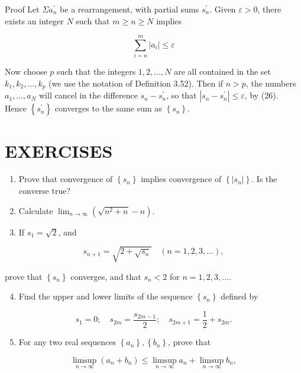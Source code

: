\documentclass[10pt]{article}
\begin{document}
Proof Let $\Sigma a_{n}^{\prime}$ be a rearrangement, with partial sums $s_{n}^{\prime}$. Given $\varepsilon>0$, there exists an integer $N$ such that $m \geq n \geq N$ implies

$$
\sum_{i=n}^{m}\left|a_{i}\right| \leq \varepsilon
$$

Now choose $p$ such that the integers $1,2, \ldots, N$ are all contained in the set $k_{1}, k_{2}, \ldots, k_{p}$ (we use the notation of Definition 3.52). Then if $n>p$, the numbers $a_{1}, \ldots, a_{N}$ will cancel in the difference $s_{n}-s_{n}^{\prime}$, so that $\left|s_{n}-s_{n}^{\prime}\right| \leq \varepsilon$, by (26). Hence $\left\{s_{n}^{\prime}\right\}$ converges to the same sum as $\left\{s_{n}\right\}$.

\section{EXERCISES}
\begin{enumerate}
  \item Prove that convergence of $\left\{s_{n}\right\}$ implies convergence of $\left\{\left|s_{n}\right|\right\}$. Is the converse true?

  \item Calculate $\lim _{n \rightarrow \infty}\left(\sqrt{n^{2}+n}-n\right)$.

  \item If $s_{1}=\sqrt{2}$, and

\end{enumerate}

$$
s_{n+1}=\sqrt{2+\sqrt{s_{n}}} \quad(n=1,2,3, \ldots),
$$

prove that $\left\{s_{n}\right\}$ converges, and that $s_{n}<2$ for $n=1,2,3, \ldots$.

\begin{enumerate}
  \setcounter{enumi}{3}
  \item Find the upper and lower limits of the sequence $\left\{s_{n}\right\}$ defined by
\end{enumerate}

$$
s_{1}=0 ; \quad s_{2 m}=\frac{s_{2 m-1}}{2} ; \quad s_{2 m+1}=\frac{1}{2}+s_{2 m} .
$$

\begin{enumerate}
  \setcounter{enumi}{4}
  \item For any two real sequences $\left\{a_{n}\right\},\left\{b_{n}\right\}$, prove that
\end{enumerate}

$$
\limsup _{n \rightarrow \infty}\left(a_{n}+b_{n}\right) \leq \limsup _{n \rightarrow \infty} a_{n}+\limsup _{n \rightarrow \infty} b_{n},
$$
\end{document}
